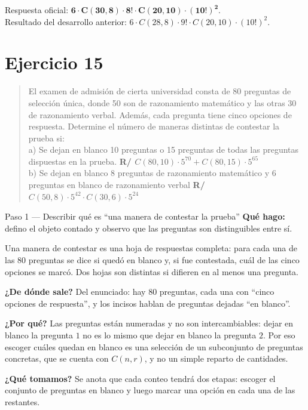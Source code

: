 \documentclass[11pt]{article}
\begin{document}
\begin{resp}
Respuesta oficial: $\mathbf{6\cdot C(30,8)\cdot 8!\cdot C(20,10)\cdot (10!)^2}$.\\
Resultado del desarrollo anterior: $6\cdot C(28,8)\cdot 9!\cdot C(20,10)\cdot (10!)^2$.
\end{resp}

\section*{Ejercicio 15}

\begin{quote}
El examen de admisión de cierta universidad consta de 80 preguntas de selección única, donde 50 son de razonamiento matemático y las otras 30 de razonamiento verbal. Además, cada pregunta tiene cinco opciones de respuesta. Determine el número de maneras distintas de contestar la prueba si:\\[2pt]
a) Se dejan en blanco 10 preguntas o 15 preguntas de todas las preguntas dispuestas en la prueba. \quad \textbf{R/ $C(80,10)\cdot 5^{70}+C(80,15)\cdot 5^{65}$}\\
b) Se dejan en blanco 8 preguntas de razonamiento matemático y 6 preguntas en blanco de razonamiento verbal \quad \textbf{R/ $C(50,8)\cdot 5^{42}\cdot C(30,6)\cdot 5^{24}$}
\end{quote}

\begin{paso}{Paso 1 --- Describir qué es ``una manera de contestar la prueba''}
\textbf{Qué hago:} defino el objeto contado y observo que las preguntas son distinguibles entre sí.

Una manera de contestar es una hoja de respuestas completa: para cada una de las $80$ preguntas se dice si quedó en blanco y, si fue contestada, cuál de las cinco opciones se marcó. Dos hojas son distintas si difieren en al menos una pregunta.

\textbf{¿De dónde sale?} Del enunciado: hay $80$ preguntas, cada una con ``cinco opciones de respuesta'', y los incisos hablan de preguntas dejadas ``en blanco''.

\textbf{¿Por qué?} Las preguntas están numeradas y no son intercambiables: dejar en blanco la pregunta $1$ no es lo mismo que dejar en blanco la pregunta $2$. Por eso escoger cuáles quedan en blanco es una selección de un subconjunto de preguntas concretas, que se cuenta con $C(n,r)$, y no un simple reparto de cantidades.

\textbf{¿Qué tomamos?} Se anota que cada conteo tendrá dos etapas: escoger el conjunto de preguntas en blanco y luego marcar una opción en cada una de las restantes.
\end{paso}
\end{document}
